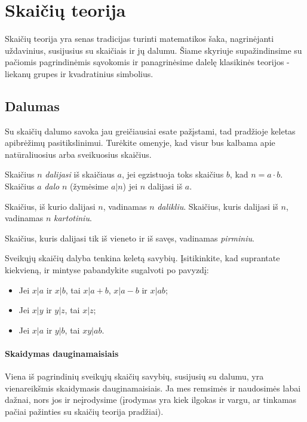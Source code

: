 \chapter{Skaičių teorija}
\thispagestyle{empty}

Skaičių teorija yra senas tradicijas turinti matematikos šaka, nagrinėjanti
uždavinius, susijusius su skaičiais ir jų dalumu. Šiame skyriuje
supažindinsime su pačiomis pagrindinėmis sąvokomis ir panagrinėsime dalelę
klasikinės teorijos - liekanų grupes ir kvadratinius simbolius.

\section{Dalumas}

Su skaičių dalumo savoka jau greičiausiai esate pažįstami, tad pradžioje
keletas apibrėžimų pasitikslinimui. Turėkite omenyje, kad visur bus kalbama
apie natūraliuosius arba sveikuosius skaičius.

\begin{api} 
  Skaičius $n$ \emph{dalijasi} iš skaičiaus $a$, jei egzistuoja toks
  skaičius $b$, kad $n=a\cdot b$. Skaičius $a$ \emph{dalo} $n$ (žymėsime $a|n$)
  jei $n$ dalijasi iš $a$.  
\end{api}

\begin{api}
  Skaičius, iš kurio dalijasi $n$, vadinamas $n$ \emph{dalikliu}.
  Skaičius, kuris dalijasi iš $n$, vadinamas $n$ \emph{kartotiniu}.  
\end{api}

\begin{api} 
  Skaičius, kuris dalijasi tik iš vieneto ir iš savęs, vadinamas
  \emph{pirminiu}. 
\end{api}

Sveikųjų skaičių dalyba tenkina keletą savybių. Įsitikinkite, kad
suprantate kiekvieną, ir mintyse pabandykite sugalvoti po pavyzdį:

\begin{itemize} 
  \item Jei $x|a$ ir $x|b$, tai $x|a+b$, $x|a-b$ ir $x|ab$;
  \item Jei $x|y$ ir $y|z$, tai $x|z$; 
  \item Jei $x|a$ ir $y|b$, tai $xy|ab$.  
\end{itemize}

\subsubsection{Skaidymas dauginamaisiais}
Viena iš pagrindinių sveikųjų skaičių savybių, susijusių su dalumu, yra
vienareikšmis skaidymasis dauginamaisiais. Ja mes remsimės ir naudosimės
labai dažnai, nors jos ir neįrodysime (įrodymas yra kiek ilgokas ir vargu,
ar tinkamas pačiai pažinties su skaičių teorija pradžiai).

